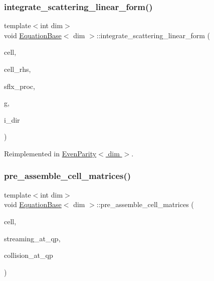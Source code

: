 \subsubsection{\texorpdfstring{integrate\+\_\+scattering\+\_\+linear\+\_\+form()}{integrate\_scattering\_linear\_form()}}
{\footnotesize\ttfamily template$<$int dim$>$ \\
void \hyperlink{class_equation_base}{Equation\+Base}$<$ dim $>$\+::integrate\+\_\+scattering\+\_\+linear\+\_\+form (\begin{DoxyParamCaption}\item[{typename Do\+F\+Handler$<$ dim $>$\+::active\+\_\+cell\+\_\+iterator \&}]{cell,  }\item[{Vector$<$ double $>$ \&}]{cell\+\_\+rhs,  }\item[{std\+::vector$<$ Vector$<$ double $>$ $>$ \&}]{sflx\+\_\+proc,  }\item[{const unsigned int \&}]{g,  }\item[{const unsigned int \&}]{i\+\_\+dir }\end{DoxyParamCaption})\hspace{0.3cm}{\ttfamily [virtual]}}



Reimplemented in \hyperlink{class_even_parity_a595082361e618c077877f92d04ebab0b}{Even\+Parity$<$ dim $>$}.

\mbox{\label{class_equation_base_a39f0465a523e038302f624f89c08a2ee}} 
\subsubsection{\texorpdfstring{pre\+\_\+assemble\+\_\+cell\+\_\+matrices()}{pre\_assemble\_cell\_matrices()}}
{\footnotesize\ttfamily template$<$int dim$>$ \\
void \hyperlink{class_equation_base}{Equation\+Base}$<$ dim $>$\+::pre\+\_\+assemble\+\_\+cell\+\_\+matrices (\begin{DoxyParamCaption}\item[{typename Do\+F\+Handler$<$ dim $>$\+::active\+\_\+cell\+\_\+iterator \&}]{cell,  }\item[{std\+::vector$<$ std\+::vector$<$ Full\+Matrix$<$ double $>$ $>$ $>$ \&}]{streaming\+\_\+at\+\_\+qp,  }\item[{std\+::vector$<$ Full\+Matrix$<$ double $>$ $>$ \&}]{collision\+\_\+at\+\_\+qp }\end{DoxyParamCaption})\hspace{0.3cm}{\ttfamily [virtual]}}



